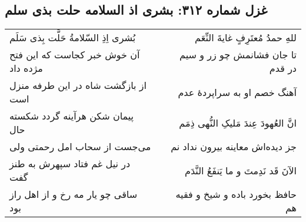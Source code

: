 \begin{center}
\section*{غزل شماره ۳۱۲: بشری اذ السلامه حلت بذی سلم}
\label{sec:sh312}
\begin{longtable}{l p{0.5cm} r}
بُشری اِذِ السّلامةُ حَلَّت بِذی سَلَم
&&
للهِ حمدُ مُعتَرِفٍ غایةَ النِّعَم
\\
آن خوش خبر کجاست که این فتح مژده داد
&&
تا جان فشانمش چو زر و سیم در قدم
\\
از بازگشت شاه در این طرفه منزل است
&&
آهنگ خصم او به سراپردهٔ عدم
\\
پیمان شکن هرآینه گردد شکسته حال
&&
انَّ العُهودَ عِندَ مَلیکِ النُّهی ذِمَم
\\
می‌جست از سحاب امل رحمتی ولی
&&
جز دیده‌اش معاینه بیرون نداد نم
\\
در نیل غم فتاد سپهرش به طنز گفت
&&
الآنَ قَد نَدِمتَ و ما یَنفَعُ النَّدَم
\\
ساقی چو یار مه رخ و از اهل راز بود
&&
حافظ بخورد باده و شیخ و فقیه هم
\\
\end{longtable}
\end{center}

